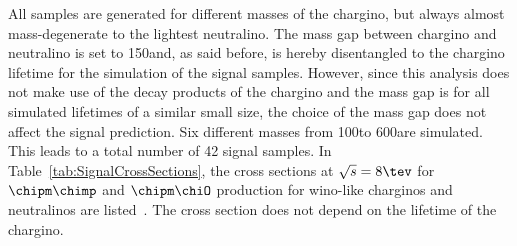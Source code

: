 All samples are generated for different masses of the chargino, but always almost mass-degenerate to the lightest neutralino.
The mass gap between chargino and neutralino is set to 150\mev and, as said before, is hereby disentangled to the chargino lifetime for the simulation of the signal samples.
However, since this analysis does not make use of the decay products of the chargino and the mass gap is for all simulated lifetimes of a similar small size, the choice of the mass gap does not affect the signal prediction.
Six different masses from 100\gev to 600\gev are simulated.
This leads to a total number of 42 signal samples.
In Table~\ref{tab:SignalCrossSections}, the cross sections at $\sqrt{s}=8\tev$ for $\chipm\chimp$ and $\chipm\chiO$ production for wino-like charginos and neutralinos are listed~\cite{bib:SignalCrossSection_2012,bib:SignalCrossSection_2013}.
The cross section does not depend on the lifetime of the chargino.
\renewcommand{\arraystretch}{1.5}
\begin{table}[h]
\centering
\caption{Simulated signal mass points with corresponding cross sections at NLO-NLL (NLO: next-to-leading order, NLL: next-to-leading logarithmic) accuracy for wino-like charginos~\cite{bib:SignalCrossSection_2012,bib:SignalCrossSection_2013}.}
\label{tab:SignalCrossSections}
\end{table}  

